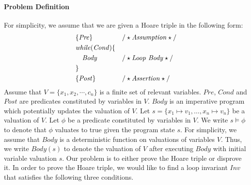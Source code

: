 \paragraph{Problem Definition} For simplicity, we assume that we are given a Hoare triple in the following form:
\begin{align*}
&\{\mathit{Pre}\} & & /\star\text{\emph{Assumption}}\star/ \\
&\mathit{while} (\mathit{Cond}) \{ && \\
&\quad \mathit{Body} & & /\star\text{\emph{Loop Body}}\star/ \\
&\} && \\
&\{\mathit{Post}\} & & /\star\text{\emph{Assertion}}\star/
\end{align*}
Assume that $V = \{x_1, x_2, \cdots, c_n\}$ is a finite set of relevant variables. $\mathit{Pre}$, $\mathit{Cond}$ and $\mathit{Post}$ are predicates constituted by variables in $V$. $\mathit{Body}$ is an imperative program which potentially updates the valuation of $V$.
Let $s = \{ x_1 \mapsto v_1, \ldots, x_n \mapsto v_n \}$ be a valuation of $V$. Let $\phi$ be a predicate constituted by variables in $V$. We write $s \models \phi$ to denote that $\phi$ valuates to true given the program state $s$. For simplicity, we assume that $\mathit{Body}$ is a deterministic function on valuations of variables $V$. Thus, we write $\mathit{Body}(s)$ to denote the valuation of $V$ after executing $\mathit{Body}$ with initial variable valuation $s$.
Our problem is to either prove the Hoare triple or disprove it. In order to prove the Hoare triple, we would like to find a loop invariant $\mathit{Inv}$ that satisfies the following three conditions.
